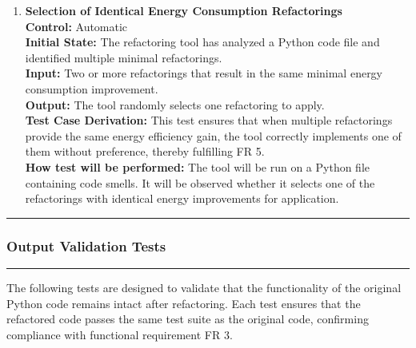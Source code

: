 \documentclass[12pt, titlepage]{article}
\newcommand{\colorrule}{\textcolor{BlueViolet}{\rule{\linewidth}{2pt}}}
\begin{document}
\begin{enumerate}[label={\bf \textcolor{Maroon}{test-FR-RS-\arabic*}}, wide=0pt, font=\itshape]
  \item \textbf{Selection of Identical Energy Consumption Refactorings}\\[2mm]
    \textbf{Control:} Automatic \\
    \textbf{Initial State:} The refactoring tool has analyzed a Python code file and identified multiple minimal refactorings.\\
    \textbf{Input:} Two or more refactorings that result in the same minimal energy consumption improvement.\\
    \textbf{Output:} The tool randomly selects one refactoring to apply.\\[2mm]
    \textbf{Test Case Derivation:} This test ensures that when multiple refactorings provide the same energy efficiency gain, the tool correctly implements one of them without preference, thereby fulfilling FR 5.\\[2mm]
    \textbf{How test will be performed:} The tool will be run on a Python file containing code smells. It will be observed whether it selects one of the refactorings with identical energy improvements for application.
\end{enumerate}

\noindent
\colorrule

\subsubsection{Output Validation Tests}
\colorrule

\medskip

\noindent
The following tests are designed to validate that the functionality of the original Python code remains intact after refactoring. Each test ensures that the refactored code passes the same test suite as the original code, confirming compliance with functional requirement FR 3.
		
\end{document}

